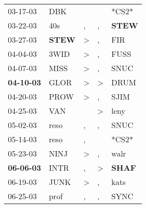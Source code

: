 \begin{supertabular}{p{0.07\textwidth}p{0.06\textwidth}p{0.02\textwidth}p{0.02\textwidth}p{0.06\textwidth}}
          03-17-03\textsuperscript{} &            DBK\textsuperscript{} &                  &                  &                            *CS2* \\
          03-22-03\textsuperscript{} &            40s\textsuperscript{} &                , &                , &  \textbf{STEW\textsuperscript{}} \\
          03-27-03\textsuperscript{} &  \textbf{STEW\textsuperscript{}} &     \textgreater &                , &            FIR\textsuperscript{} \\
          04-04-03\textsuperscript{} &           3WID\textsuperscript{} &     \textgreater &                , &           FUSS\textsuperscript{} \\
          04-07-03\textsuperscript{} &           MISS\textsuperscript{} &     \textgreater &                , &           SNUC\textsuperscript{} \\
 \textbf{04-10-03\textsuperscript{}} &           GLOR\textsuperscript{} &     \textgreater &     \textgreater &           DRUM\textsuperscript{} \\
          04-20-03\textsuperscript{} &           PROW\textsuperscript{} &     \textgreater &                , &           SJIM\textsuperscript{} \\
          04-25-03\textsuperscript{} &            VAN\textsuperscript{} &                  &     \textgreater &           leny\textsuperscript{} \\
          05-02-03\textsuperscript{} &           reso\textsuperscript{} &                , &                , &           SNUC\textsuperscript{} \\
          05-14-03\textsuperscript{} &           reso\textsuperscript{} &                , &                  &                            *CS2* \\
          05-23-03\textsuperscript{} &           NINJ\textsuperscript{} &     \textgreater &                , &           walr\textsuperscript{} \\
 \textbf{06-06-03\textsuperscript{}} &           INTR\textsuperscript{} &                , &     \textgreater &  \textbf{SHAF\textsuperscript{}} \\
          06-19-03\textsuperscript{} &           JUNK\textsuperscript{} &     \textgreater &                , &           kats\textsuperscript{} \\
          06-25-03\textsuperscript{} &           prof\textsuperscript{} &                , &                , &           SYNC\textsuperscript{} \\

\end{supertabular}

